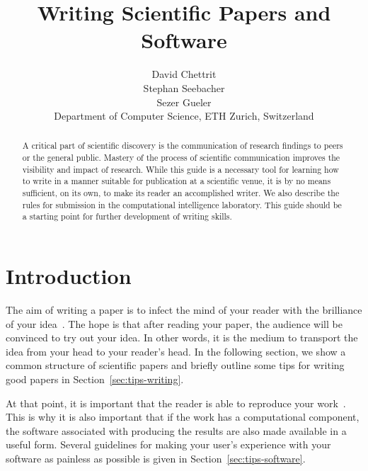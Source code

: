 \documentclass[10pt,conference,compsocconf]{IEEEtran}
\begin{document}
\title{Writing Scientific Papers and Software}

\author{
  David Chettrit\\
  Stephan Seebacher\\
  Sezer Gueler\\
  Department of Computer Science, ETH Zurich, Switzerland
}




\maketitle

\begin{abstract}
  A critical part of scientific discovery is the
  communication of research findings to peers or the general public.
  Mastery of the process of scientific communication improves the
  visibility and impact of research. While this guide is a necessary
  tool for learning how to write in a manner suitable for publication
  at a scientific venue, it is by no means sufficient, on its own, to
  make its reader an accomplished writer. We also describe the rules
  for submission in the computational intelligence laboratory.
  This guide should be a
  starting point for further development of writing skills.
\end{abstract}

\section{Introduction}

The aim of writing a paper is to infect the mind of your reader with
the brilliance of your idea~\cite{jones08}. 
The hope is that after reading your
paper, the audience will be convinced to try out your idea. In other
words, it is the medium to transport the idea from your head to your
reader's head. 
In the following
section, we show a common structure of scientific papers and briefly
outline some tips for writing good papers in
Section~\ref{sec:tips-writing}.

At that
point, it is important that the reader is able to reproduce your
work~\cite{schwab00,wavelab,gentleman05}. This is why it is also
important that if the work has a computational component, the software
associated with producing the results are also made available in a
useful form. Several guidelines for making your user's experience with
your software as painless as possible is given in
Section~\ref{sec:tips-software}.
\end{document}
